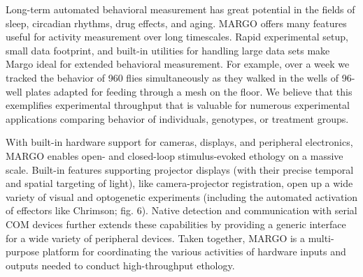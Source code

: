 \documentclass[10pt]{article}
\begin{document}
\begin{multicols}{2}
Long-term automated behavioral measurement has great potential in the fields of sleep, circadian rhythms, drug effects, and aging. MARGO offers many features useful for activity measurement over long timescales. Rapid experimental setup, small data footprint, and built-in utilities for handling large data sets make Margo ideal for extended behavioral measurement. For example, over a week we tracked the behavior of 960 flies simultaneously as they walked in the wells of 96-well plates adapted for feeding through a mesh on the floor. We believe that this exemplifies experimental throughput that is valuable for numerous experimental applications comparing behavior of individuals, genotypes, or treatment groups.  

With built-in hardware support for cameras, displays, and peripheral electronics, MARGO enables open- and closed-loop stimulus-evoked ethology on a massive scale. Built-in features supporting projector displays (with their precise temporal and spatial targeting of light), like camera-projector registration, open up a wide variety of visual and optogenetic experiments (including the automated activation of effectors like Chrimson; fig. 6). Native detection and communication with serial COM devices further extends these capabilities by providing a generic interface for a wide variety of peripheral devices. Taken together, MARGO is a multi-purpose platform for coordinating the various activities of hardware inputs and outputs needed to conduct high-throughput ethology. 


\end{multicols}
\end{document}
